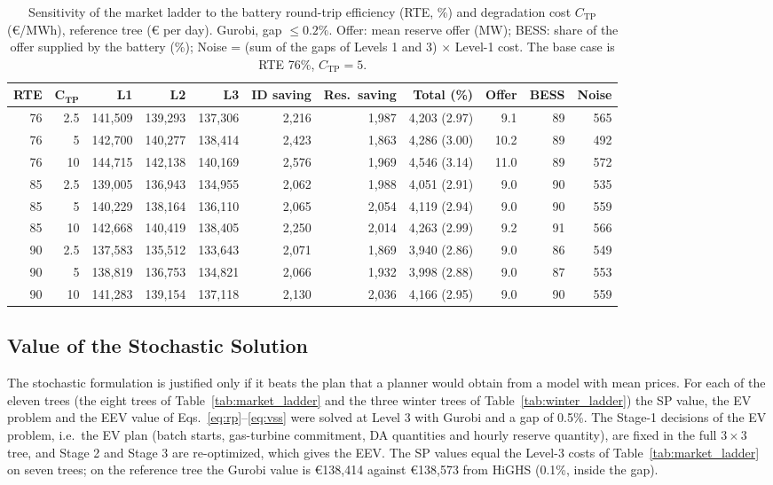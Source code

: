 \documentclass[5p,times,twocolumn]{elsarticle}
\begin{document}
\begin{table}[t]
\caption{Sensitivity of the market ladder to the battery round-trip efficiency (RTE, \%) and degradation cost $C_{\text{TP}}$ (\euro/MWh), reference tree (\euro{} per day). Gurobi, gap $\le 0.2\%$. Offer: mean reserve offer (MW); BESS: share of the offer supplied by the battery (\%); Noise = (sum of the gaps of Levels 1 and 3) $\times$ Level-1 cost. The base case is RTE 76\%, $C_{\text{TP}}=5$.}
\label{tab:battery_sens}
\centering
\scriptsize
\setlength{\tabcolsep}{4pt}
\begin{tabular}{@{}rrrrrrrrrrr@{}}
\toprule
\textbf{RTE} & $\boldsymbol{C_{\text{TP}}}$ & \textbf{L1} & \textbf{L2} & \textbf{L3} & \textbf{ID saving} & \textbf{Res.\ saving} & \textbf{Total (\%)} & \textbf{Offer} & \textbf{BESS} & \textbf{Noise} \\
\midrule
76 & 2.5 & 141,509 & 139,293 & 137,306 & 2,216 & 1,987 & 4,203 (2.97) & 9.1 & 89 & 565 \\
76 & 5 & 142,700 & 140,277 & 138,414 & 2,423 & 1,863 & 4,286 (3.00) & 10.2 & 89 & 492 \\
76 & 10 & 144,715 & 142,138 & 140,169 & 2,576 & 1,969 & 4,546 (3.14) & 11.0 & 89 & 572 \\
85 & 2.5 & 139,005 & 136,943 & 134,955 & 2,062 & 1,988 & 4,051 (2.91) & 9.0 & 90 & 535 \\
85 & 5 & 140,229 & 138,164 & 136,110 & 2,065 & 2,054 & 4,119 (2.94) & 9.0 & 90 & 559 \\
85 & 10 & 142,668 & 140,419 & 138,405 & 2,250 & 2,014 & 4,263 (2.99) & 9.2 & 91 & 566 \\
90 & 2.5 & 137,583 & 135,512 & 133,643 & 2,071 & 1,869 & 3,940 (2.86) & 9.0 & 86 & 549 \\
90 & 5 & 138,819 & 136,753 & 134,821 & 2,066 & 1,932 & 3,998 (2.88) & 9.0 & 87 & 553 \\
90 & 10 & 141,283 & 139,154 & 137,118 & 2,130 & 2,036 & 4,166 (2.95) & 9.0 & 90 & 559 \\
\bottomrule
\end{tabular}
\end{table}


\subsection{Value of the Stochastic Solution}
\label{sec:vss}
The stochastic formulation is justified only if it beats the plan that a planner would obtain from a model with mean prices. For each of the eleven trees (the eight trees of Table~\ref{tab:market_ladder} and the three winter trees of Table~\ref{tab:winter_ladder}) the SP value, the EV problem and the EEV value of Eqs.~\eqref{eq:rp}--\eqref{eq:vss} were solved at Level 3 with Gurobi and a gap of 0.5\%. The Stage-1 decisions of the EV problem, i.e.\ the EV plan (batch starts, gas-turbine commitment, DA quantities and hourly reserve quantity), are fixed in the full $3\times3$ tree, and Stage 2 and Stage 3 are re-optimized, which gives the EEV. The SP values equal the Level-3 costs of Table~\ref{tab:market_ladder} on seven trees; on the reference tree the Gurobi value is \euro 138,414 against \euro 138,573 from HiGHS (0.1\%, inside the gap).
\end{document}
